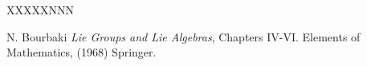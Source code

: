 \documentclass[12pt]{article}
\numberwithin{equation}{section}
\numberwithin{equation}{section}
\numberwithin{subeq}{equation}
\begin{document}
\begin{thebibliography}{XXXXXNNN}

 N. Bourbaki {\it Lie Groups and Lie Algebras}, Chapters IV-VI.  Elements of Mathematics,  (1968) Springer.





\end{thebibliography}
\end{document}
